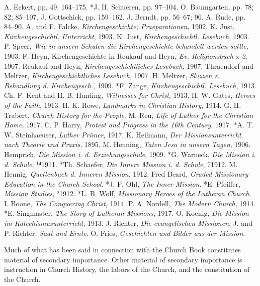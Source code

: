 A. Eckert, pp. 49. 164–175. *J. H. Schueren, pp. 97–104. O. Baumgarten, pp. 78; 82; 85–107. J. Gottschick, pp. 159–162. J. Berndt, pp. 56–67; 96. A. Rude, pp. 84–90. A. and F. Falcke, \emph{Kirchengeschichte; Praeparationen}, 1902. K. Just, \emph{Kirchengeschichtl. Unterricht}, 1903. K. Just, \emph{Kirchengeschichtl. Lesebuch}, 1903. P. Speer, \emph{Wie in unsern Schulen die Kirchengeschichte behandelt werden sollte}, 1903. F. Heyn, Kirchengeschichte in Reukauf and Heyn, \emph{Ev. Religionsbuch x 2}, 1907. Reukauf and Heyn, \emph{Kirchengeschichtliches Lesebuch}, 1907. Thraendorf and Meltzer, \emph{Kirchengeschichtliches Lesebuch}, 1907. H. Meltzer, \emph{Skizzen z. Behandlung d. Kirchengesch.}, 1909. *F. Zange, \emph{Kirchengeschichtl. Lesebuch}, 1913. Ch. F. Kent and H. B. Hunting, \emph{Witnesses for Christ}, 1913. H. W. Gates, \emph{Heroes of the Faith}, 1913. H. K. Rowe, \emph{Landmarks in Christian History}, 1914. G. H. Trabert, \emph{Church History for the People}. M. Reu, \emph{Life of Luther for the Christian Home}, 1917. C. P. Harry, \emph{Protest and Progress in the 16th Century}, 1917. *A. T. W. Steinhaeuser, \emph{Luther Primer}, 1917. K. Heilmann, \emph{Der Missionsunterricht nach Theorie und Praxis}, 1895. M. Henning, \emph{Taten Jesu in unsern Tagen}, 1906. Hemprich, \emph{Die Mission i. d. Erziehungsschule}, 1909. *G. Warneck, \emph{Die Mission i. d. Schule}, ¹⁴1911. *Th. Schaefer, \emph{Die Innere Mission i. d. Schule}, 71912. M. Hennig, \emph{Quellenbuch d. Inneren Mission}, 1912. Fred Beard, \emph{Graded Missionary Education in the Church School}. *J. F. Ohl, \emph{The Inner Mission}. *E. Pfeiffer, \emph{Mission Studies}, ²1912. *L. B. Wolf, \emph{Missionary Heroes of the Lutheran Church}. I. Boone, \emph{The Conquering Christ}, 1914. P. A. Nordell, \emph{The Modern Church}, 1914. *E. Singmaster, \emph{The Story of Lutheran Missions}, 1917. O. Koenig, \emph{Die Mission im Katechismusunterricht}, 1913. J. Richter, \emph{Die evangelischen Missionen}. J. and P. Richter, \emph{Saat und Ernte}. O. Fries, \emph{Geschichten und Bilder aus der Mission}.

Much of what has been said in connection with the Church Book constitutes material of secondary importance. Other material of secondary importance is instruction in Church History, the labors of the Church, and the constitution of the Church.

